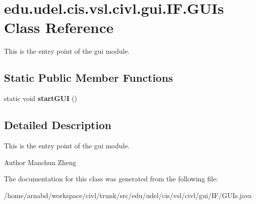 \hypertarget{classedu_1_1udel_1_1cis_1_1vsl_1_1civl_1_1gui_1_1IF_1_1GUIs}{}\section{edu.\+udel.\+cis.\+vsl.\+civl.\+gui.\+I\+F.\+G\+U\+Is Class Reference}
\label{classedu_1_1udel_1_1cis_1_1vsl_1_1civl_1_1gui_1_1IF_1_1GUIs}


This is the entry point of the gui module.  


\subsection*{Static Public Member Functions}
\begin{DoxyCompactItemize}
\item 
\hypertarget{classedu_1_1udel_1_1cis_1_1vsl_1_1civl_1_1gui_1_1IF_1_1GUIs_a9f5d38197178ef62407e78f5b5695e9d}{}static void {\bfseries start\+G\+U\+I} ()\label{classedu_1_1udel_1_1cis_1_1vsl_1_1civl_1_1gui_1_1IF_1_1GUIs_a9f5d38197178ef62407e78f5b5695e9d}

\end{DoxyCompactItemize}


\subsection{Detailed Description}
This is the entry point of the gui module. 

\begin{DoxyAuthor}{Author}
Manchun Zheng 
\end{DoxyAuthor}


The documentation for this class was generated from the following file\+:\begin{DoxyCompactItemize}
\item 
/home/arnabd/workspace/civl/trunk/src/edu/udel/cis/vsl/civl/gui/\+I\+F/G\+U\+Is.\+java\end{DoxyCompactItemize}
